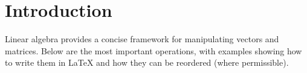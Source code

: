\section{Introduction}
Linear algebra provides a concise framework for manipulating vectors and matrices. 
Below are the most important operations, with examples showing how to write them 
in \LaTeX{} and how they can be reordered (where permissible).